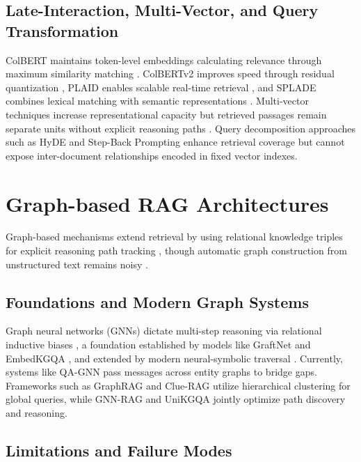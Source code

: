 \documentclass[runningheads]{llncs}
\begin{document}
\subsection{Late-Interaction, Multi-Vector, and Query Transformation}

ColBERT maintains token-level embeddings calculating relevance through maximum similarity matching \cite{9}. ColBERTv2 improves speed through residual quantization \cite{39}, PLAID enables scalable real-time retrieval \cite{40}, and SPLADE combines lexical matching with semantic representations \cite{42}. Multi-vector techniques increase representational capacity but retrieved passages remain separate units without explicit reasoning paths \cite{41}. Query decomposition approaches such as HyDE \cite{89} and Step-Back Prompting \cite{90} enhance retrieval coverage but cannot expose inter-document relationships encoded in fixed vector indexes.


\section{Graph-based RAG Architectures}

Graph-based mechanisms extend retrieval by using relational knowledge triples for explicit reasoning path tracking \cite{14,48}, though automatic graph construction from unstructured text remains noisy \cite{14,15}.

\subsection{Foundations and Modern Graph Systems}

Graph neural networks (GNNs) dictate multi-step reasoning via relational inductive biases \cite{20}, a foundation established by models like GraftNet \cite{79} and EmbedKGQA \cite{81}, and extended by modern neural-symbolic traversal \cite{82,83}. Currently, systems like QA-GNN \cite{19} pass messages across entity graphs to bridge gaps. Frameworks such as GraphRAG \cite{54} and Clue-RAG \cite{57} utilize hierarchical clustering for global queries, while GNN-RAG \cite{56} and UniKGQA \cite{58} jointly optimize path discovery and reasoning.

\subsection{Limitations and Failure Modes}
\end{document}
